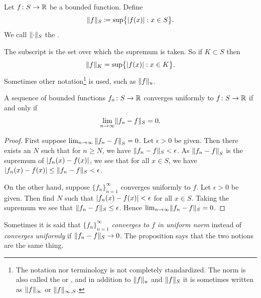 \begin{defn} \label{def:unifnorm}
Let $f \colon S \to {\mathbb{R}}$ be a bounded function.  Define
\begin{equation*}
\lVert {f} \rVert_S \coloneqq
\sup \bigl\{ \left\lvert {f(x)} \right\rvert : x \in S \bigr\} .
\end{equation*}
We call $\lVert {\cdot} \rVert_S$ the \emph{}.
\end{defn}

The subscript is the set over which the supremum is taken.  So if $K \subset S$
then
\begin{equation*}
\lVert {f} \rVert_K =
\sup \bigl\{ \left\lvert {f(x)} \right\rvert : x \in K \bigr\} .
\end{equation*}
Sometimes other notation\footnote{The notation nor terminology
is not completely standardized.  The norm is also called the
\emph{} or
\emph{}, and in addition
to $\lVert {f} \rVert_u$ and $\lVert {f} \rVert_S$ it is sometimes written
as $\lVert {f} \rVert_{\infty}$ or $\lVert {f} \rVert_{\infty,S}$.}
is used, such as $\lVert {f} \rVert_u$.

\begin{prop}
A sequence of bounded functions $f_n \colon S \to {\mathbb{R}}$ converges
uniformly to $f \colon S \to {\mathbb{R}}$ if and only if
\begin{equation*}
\lim_{n\to\infty} \lVert {f_n - f} \rVert_S = 0 .
\end{equation*}
\end{prop}

\begin{proof}
First suppose 
$\lim_{n\to\infty} \left\lVert {f_n - f} \right\rVert_S = 0$.  Let $\epsilon > 0$ be
given.  Then there exists an $N$ such that
for $n \geq N$, we have $\lVert {f_n - f} \rVert_S < \epsilon$.  As $\left\lVert {f_n-f} \right\rVert_S$
is the supremum of $\left\lvert {f_n(x)-f(x)} \right\rvert$, we see that for all $x \in S$,
we have $\left\lvert {f_n(x)-f(x)} \right\rvert \leq \lVert {f_n - f} \rVert_S < \epsilon$.

On the other hand, suppose $\{ f_n \}_{n=1}^\infty$ converges uniformly to $f$.
Let $\epsilon > 0$ be given.  Then find $N$ such that 
$\left\lvert {f_n(x)-f(x)} \right\rvert < \epsilon$ for all $x \in S$.
Taking the supremum we see that
$\lVert {f_n - f} \rVert_S \leq \epsilon$.  Hence $\lim_{n\to\infty} \lVert {f_n-f} \rVert_S = 0$.
\end{proof}

Sometimes it is said that \emph{$\{ f_n \}_{n=1}^\infty$ converges to $f$ in uniform norm}
instead of \emph{converges uniformly} if $\lVert {f_n-f} \rVert_S \to 0$.  The proposition
says that the two notions are the same thing.

